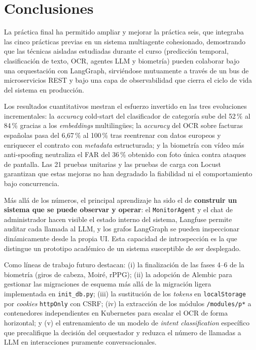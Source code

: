 \section{Conclusiones}
\label{sec:conclusiones}

La práctica final ha permitido ampliar y mejorar la práctica seis, que integraba las cinco prácticas previas
en un sistema multiagente cohesionado, demostrando que las técnicas
aisladas estudiadas durante el curso (predicción temporal,
clasificación de texto, OCR, agentes LLM y biometría) pueden
colaborar bajo una orquestación con LangGraph, sirviéndose
mutuamente a través de un bus de microservicios REST y bajo una
capa de observabilidad que cierra el ciclo de vida del
sistema en producción.

Los resultados cuantitativos mestran el esfuerzo invertido en las
tres evoluciones incrementales: la \textit{accuracy} cold-start del
clasificador de categoría sube del 52\,\% al 84\,\% gracias a los
\textit{embeddings} multilingües; la \textit{accuracy} del OCR
sobre facturas españolas pasa del 6{,}67\,\% al 100\,\% tras
reentrenar con datos europeos y enriquecer el contrato con
\textit{metadata} estructurada; y la biometría con vídeo más
anti-spoofing neutraliza el FAR del 36\,\% obtenido con foto única
contra ataques de pantalla. Las 21 pruebas unitarias y las pruebas
de carga con Locust garantizan que estas mejoras no han degradado
la fiabilidad ni el comportamiento bajo concurrencia.

Más allá de los números, el principal aprendizaje ha sido el de
\textbf{construir un sistema que se puede observar y operar}: el
\texttt{MonitorAgent} y el chat de administrador hacen visible el
estado interno del sistema, Langfuse permite auditar cada llamada al
LLM, y los grafos LangGraph se pueden inspeccionar dinámicamente
desde la propia UI. Esta capacidad de introspección es la que
distingue un prototipo académico de un sistema susceptible de ser
desplegado.

Como líneas de trabajo futuro destacan: (i) la finalización de las
fases 4--6 de la biometría (giros de cabeza, Moiré, rPPG); (ii) la
adopción de Alembic para gestionar las migraciones de esquema más
allá de la migración ligera implementada en \texttt{init\_db.py};
(iii) la sustitución de los \textit{tokens} en \texttt{localStorage}
por \textit{cookies} \texttt{httpOnly} con CSRF; (iv) la extracción
de los módulos \texttt{/modules/p*} a contenedores independientes en
Kubernetes para escalar el OCR de forma horizontal; y (v) el
entrenamiento de un modelo de \textit{intent classification}
específico que precalifique la decisión del orquestador y reduzca el
número de llamadas a LLM en interacciones puramente conversacionales.
